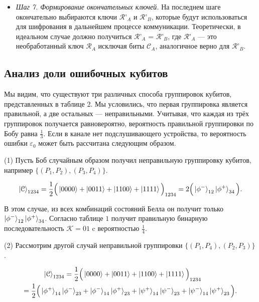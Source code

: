 \documentclass[a4paper,11pt]{article}
\begin{document}
\begin{itemize}
\item \textit{Шаг 7. Формирование окончательных ключей.} На последнем шаге окончательно выбираются ключи $\mathcal{R}’_A$ и $\mathcal{R}’_B$, которые будут использоваться для шифрования в дальнейшем процессе коммуникации. Теоретически, в идеальном случае должно получиться $\mathcal{R}’_A$ = $\mathcal{R}’_B$, где $\mathcal{R}’_A$ --- это необработанный ключ $\mathcal{R}_A$ исключая биты $\mathcal{C}_A$, аналогичное верно для $\mathcal{R}’_B$.
\end{itemize}

\subsection{Анализ доли ошибочных кубитов}

Мы видим, что существуют три различных способа группировок кубитов, представленных в таблице 2. Мы условились, что первая группировка является правильной, а две остальных --- неправильными. Учитывая, что каждая из трёх группировок получается равновероятно, вероятность правильной группировки по Бобу равна $\frac{1}{3}$. Если в канале нет подслушивающего устройства, то вероятность ошибки $\varepsilon_0$ может быть рассчитана следующим образом.

(1) Пусть Боб случайным образом получил неправильную группировку кубитов, например $\{(P_1 , P_2), (P_3 , P_4)\}$.

\begin{equation*}
\ket{\mathcal{C}}_{1234} = \dfrac{1}{2} \Big(\ket{0000} + \ket{0011}
 + \ket{1100} + \ket{1111} \Big)_{1234} = 2 \Big(\ket{\phi^-}_{12} \ket{\phi^+}_{34}\Big).
\end{equation*}

В этом случае, из всех комбинаций состояний Белла он получит только $\ket{\phi^-}_{12} \ket{\phi^+}_{34}$. Согласно таблице $1$ получит правильную бинарную последовательность $\mathcal{K} = 01$ c вероятностью $\frac{1}{4}$.

(2) Рассмотрим другой случай неправильной группировки $\{(P_1, P_4), (P_2, P_3)\}$.

\begin{align*}
\ket{\mathcal{C}}_{1234} = \dfrac{1}{2} \Big(\ket{0000} + \ket{0011}
&+ \ket{1100} + \ket{1111} \Big)_{1234} \nonumber\\
 = \dfrac{1}{2} \Big(
\ket{\phi^+}_{14} \ket{\phi^-}_{23} + \ket{\phi^-}_{14} \ket{\phi^+}_{23} &+ 
\ket{\psi^+}_{14} \ket{\psi^-}_{23} + \ket{\psi^-}_{14} \ket{\psi^+}_{23} \Big).
\end{align*}
\end{document}
